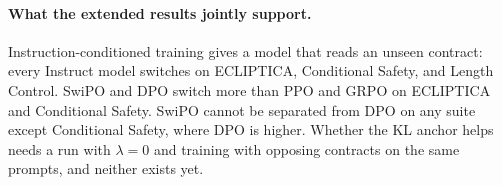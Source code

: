 \vspace{-0.2em}
\paragraph{\textbf{What the extended results jointly support.}}
Instruction-conditioned training gives a model that reads an unseen contract: every Instruct model switches on ECLIPTICA, Conditional Safety, and Length Control. SwiPO and DPO switch more than PPO and GRPO on ECLIPTICA and Conditional Safety. SwiPO cannot be separated from DPO on any suite except Conditional Safety, where DPO is higher. Whether the KL anchor helps needs a run with $\lambda=0$ and training with opposing contracts on the same prompts, and neither exists yet.
